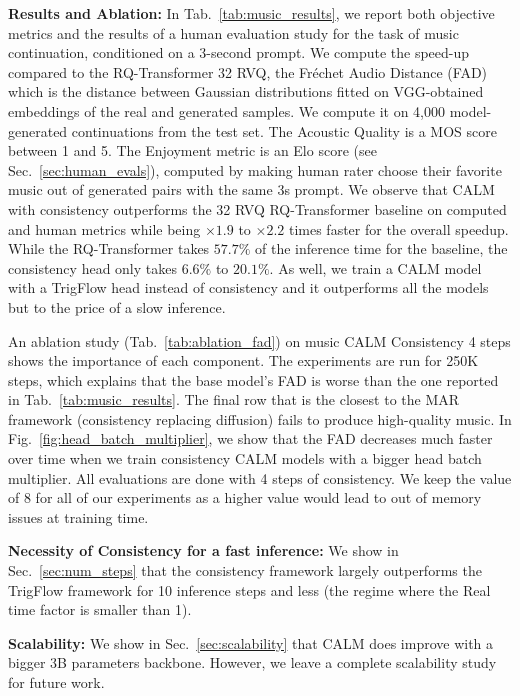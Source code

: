 \noindent\textbf{Results and Ablation:} In Tab.~\ref{tab:music_results}, we report both objective metrics and the results of a human evaluation study for the task of music continuation, conditioned on a 3-second prompt. 
We compute the speed-up compared to the RQ-Transformer 32 RVQ, the Fréchet Audio Distance (FAD) which is the distance between Gaussian distributions fitted on VGG-obtained embeddings of the real and generated samples. We compute it on 4,000 model-generated continuations from the test set. The Acoustic Quality is a MOS score between 1 and 5. The Enjoyment metric is an Elo score (see Sec.~\ref{sec:human_evals}), computed by making human rater choose their favorite music out of generated pairs with the same 3s prompt. We observe that CALM with consistency outperforms the 32 RVQ RQ-Transformer baseline on computed and human metrics while being $\times1.9$ to $\times2.2$ times faster for the overall speedup. While the RQ-Transformer takes $57.7\%$ of the inference time for the baseline, the consistency head only takes $6.6\%$ to $20.1\%$. As well, we train a CALM model with a TrigFlow head instead of consistency and it outperforms all the models but to the price of a slow inference.


An ablation study (Tab.~\ref{tab:ablation_fad}) on music CALM Consistency 4 steps shows the importance of each component. The experiments are run for 250K steps, which explains that the base model's FAD is worse than the one reported in Tab.~\ref{tab:music_results}. The final row that is the closest to the MAR framework (consistency replacing diffusion) fails to produce high-quality music. In Fig.~\ref{fig:head_batch_multiplier}, we show that the FAD decreases much faster over time when we train consistency CALM models with a bigger head batch multiplier. All evaluations are done with 4 steps of consistency. We keep the value of 8 for all of our experiments as a higher value would lead to out of memory issues at training time. 

\textbf{Necessity of Consistency for a fast inference:} We show in Sec.~\ref{sec:num_steps} that the consistency framework largely outperforms the TrigFlow framework for 10 inference steps and less (the regime where the Real time factor is smaller than 1). 

\textbf{Scalability:} We show in Sec.~\ref{sec:scalability} that CALM does improve with a bigger 3B parameters backbone. However, we leave a complete scalability study for future work.


